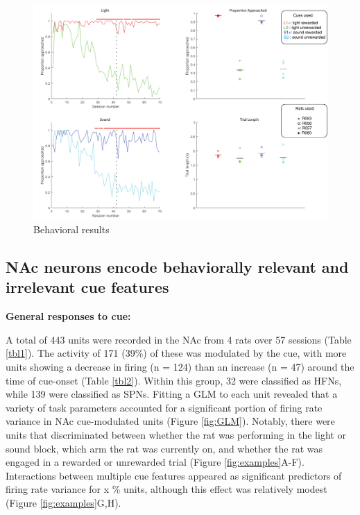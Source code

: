 \documentclass[11pt]{article}
\begin{document}
\begin{figure}[h]
\centering
\includegraphics[width=\textwidth]{Fig 4 - Behavioral results.png}
\caption{Behavioral results}
\label{fig:behav}
\end{figure}

\subsection*{NAc neurons encode behaviorally relevant and irrelevant cue features}

{\bf General responses to cue:}

A total of 443 units were recorded in the NAc from 4 rats over 57 sessions (Table \ref{tbl1}). The activity of 171 (39\%) of these was modulated by the cue, with more units showing a decrease in firing (n = 124) than an increase (n = 47) around the time of cue-onset (Table \ref{tbl2}). Within this group, 32 were classified as HFNs, while 139 were classified as SPNs. Fitting a GLM to each unit revealed that a variety of task parameters accounted for a significant portion of firing rate variance in NAc cue-modulated units (Figure \ref{fig:GLM}). Notably, there were units that discriminated between whether the rat was performing in the light or sound block, which arm the rat was currently on, and whether the rat was engaged in a rewarded or unrewarded trial (Figure \ref{fig:examples}A-F). Interactions between multiple cue features appeared as significant predictors of firing rate variance for x \% units, although this effect was relatively modest (Figure \ref{fig:examples}G,H).
\end{document}
